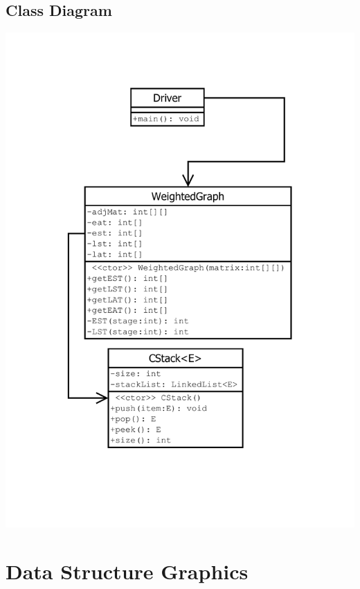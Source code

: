 	\subsection{Class Diagram}
	\begin{center}
		\includegraphics[scale=0.80]{4/cd.pdf}
	\end{center}
	\newpage
	\thispagestyle{empty}
	\begin{landscape}
		
	\end{landscape}


	\section{Data Structure Graphics}
